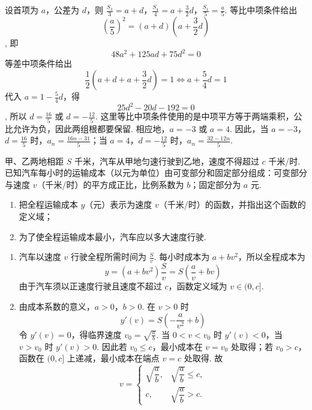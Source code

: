\begin{solution}
设首项为 \(a\)，公差为 \(d\)，则 \(\frac{S_3}{3}=a+d\)，\(\frac{S_4}{4}=a+\frac32d\)，\(\frac{S_1}{5}=\frac a5\).
等比中项条件给出
\[
\left(\frac a5\right)^2=(a+d)\left(a+\frac32d\right)
\],
即
\[
48a^2+125ad+75d^2=0
\]
等差中项条件给出
\[
\frac12\left(a+d+a+\frac32d\right)=1
\iff a+\frac54d=1
\]
代入 \(a=1-\frac54d\)，得
\[
25d^2-20d-192=0
\],
所以 \(d=\frac{16}{5}\) 或 \(d=-\frac{12}{5}\). 这里等比中项条件使用的是中项平方等于两端乘积，公比允许为负，因此两组根都要保留. 相应地，\(a=-3\) 或 \(a=4\). 因此，当 \(a=-3\)，\(d=\frac{16}{5}\) 时，\(a_n=\frac{16n-31}{5}\)；当 \(a=4\)，\(d=-\frac{12}{5}\) 时，\(a_n=\frac{32-12n}{5}\).
\end{solution}

\begin{problem}
甲、乙两地相距 \(S\) 千米，汽车从甲地匀速行驶到乙地，速度不得超过 \(c\) 千米/时. 已知汽车每小时的运输成本（以元为单位）由可变部分和固定部分组成：可变部分与速度 \(v\)（千米/时）的平方成正比，比例系数为 \(b\)；固定部分为 \(a\) 元.
\begin{enumerate}
\item 把全程运输成本 \(y\)（元）表示为速度 \(v\)（千米/时）的函数，并指出这个函数的定义域；
\item 为了使全程运输成本最小，汽车应以多大速度行驶.
\end{enumerate}
\end{problem}

\begin{solution}
\begin{enumerate}
\item 汽车以速度 \(v\) 行驶全程所需时间为 \(\frac{S}{v}\). 每小时成本为 \(a+bv^2\)，所以全程成本为
\[
y=(a+bv^2)\frac Sv=S\left(\frac av+bv\right)
\]
由于汽车须以正速度行驶且速度不超过 \(c\)，函数定义域为 \(v\in(0,c]\).

\item 由成本系数的意义，\(a>0\)，\(b>0\). 在 \(v>0\) 时
\[
y'(v)=S\left(-\frac a{v^2}+b\right)
\]
令 \(y'(v)=0\)，得临界速度 \(v_0=\sqrt{\frac{a}{b}}\). 当 \(0<v<v_0\) 时 \(y'(v)<0\)，当 \(v>v_0\) 时 \(y'(v)>0\). 因此若 \(v_0\leqslant c\)，最小成本在 \(v=v_0\) 处取得；若 \(v_0>c\)，函数在 \((0,c]\) 上递减，最小成本在端点 \(v=c\) 处取得. 故
\[
v=
\begin{cases}
\sqrt{\dfrac ab},&\sqrt{\dfrac ab}\leqslant c,\\[4pt]
c,&\sqrt{\dfrac ab}>c.
\end{cases}
\]
\end{enumerate}
\end{solution}


